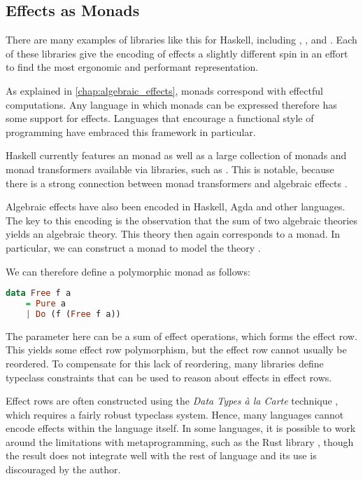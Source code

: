 \subsection{Effects as Monads}

There are many examples of libraries like this for Haskell, including , ,  and . Each of these libraries give the encoding of effects a slightly different spin in an effort to find the most ergonomic and performant representation.

As explained in \cref{chap:algebraic_effects}, monads correspond with effectful computations. Any language in which monads can be expressed therefore has some support for effects. Languages that encourage a functional style of programming have embraced this framework in particular.

Haskell currently features an  monad \autocite{peyton_jones_imperative_1993} as well as a large collection of monads and monad transformers available via libraries, such as . This is notable, because there is a strong connection between monad transformers and algebraic effects \autocite{schrijvers_monad_2019}.

Algebraic effects have also been encoded in Haskell, Agda and other languages. The key to this encoding is the observation that the sum of two algebraic theories yields an algebraic theory. This theory then again corresponds to a monad. In particular, we can construct a  monad to model the theory \autocite{kammar_handlers_2013,swierstra_data_2008}.

We can therefore define a polymorphic  monad as follows:
\begin{lstlisting}[language=haskell]
data Free f a
    = Pure a
    | Do (f (Free f a))
\end{lstlisting}
The parameter  here can be a sum of effect operations, which forms the effect row. This yields some effect row polymorphism, but the effect row cannot usually be reordered. To compensate for this lack of reordering, many libraries define typeclass constraints that can be used to reason about effects in effect rows.

Effect rows are often constructed using the \emph{Data Types à la Carte} technique \autocite{swierstra_data_2008}, which requires a fairly robust typeclass system. Hence, many languages cannot encode effects within the language itself. In some languages, it is possible to work around the limitations with metaprogramming, such as the Rust library , though the result does not integrate well with the rest of language and its use is discouraged by the author.

